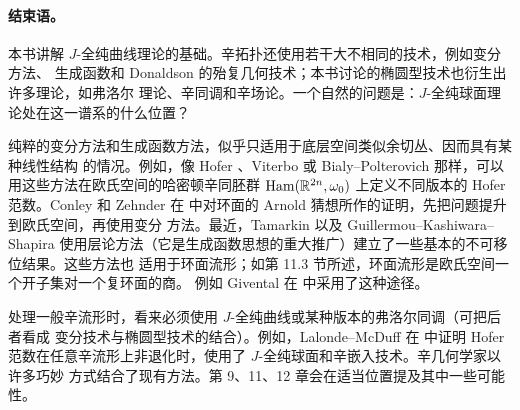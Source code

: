\paragraph{结束语。}
本书讲解 $J$-全纯曲线理论的基础。辛拓扑还使用若干大不相同的技术，例如变分方法、
生成函数和 Donaldson 的殆复几何技术；本书讨论的椭圆型技术也衍生出许多理论，如弗洛尔
理论、辛同调和辛场论。一个自然的问题是：$J$-全纯球面理论处在这一谱系的什么位置？

纯粹的变分方法和生成函数方法，似乎只适用于底层空间类似余切丛、因而具有某种线性结构
的情况。例如，像 Hofer 、Viterbo  或 Bialy--Polterovich
 那样，可以用这些方法在欧氏空间的哈密顿辛同胚群
$\operatorname{Ham}(\mathbb R^{2n},\omega_0)$ 上定义不同版本的 Hofer 范数。Conley 和 Zehnder 在
 中对环面的 Arnold 猜想所作的证明，先把问题提升到欧氏空间，再使用变分
方法。最近，Tamarkin  以及 Guillermou--Kashiwara--Shapira 
使用层论方法（它是生成函数思想的重大推广）建立了一些基本的不可移位结果。这些方法也
适用于环面流形；如第 11.3 节所述，环面流形是欧氏空间一个开子集对一个复环面的商。
例如 Givental 在  中采用了这种途径。

处理一般辛流形时，看来必须使用 $J$-全纯曲线或某种版本的弗洛尔同调（可把后者看成
变分技术与椭圆型技术的结合）。例如，Lalonde--McDuff 在  中证明 Hofer
范数在任意辛流形上非退化时，使用了 $J$-全纯球面和辛嵌入技术。辛几何学家以许多巧妙
方式结合了现有方法。第 9、11、12 章会在适当位置提及其中一些可能性。
